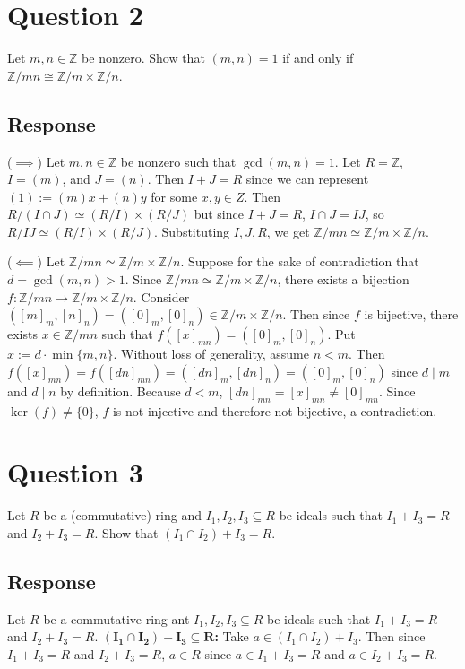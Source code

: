 \documentclass [12pt] {article}
\newcommand{\Z}{\mathbb{Z}}
\renewcommand{\bf}[1]{\textbf{{#1}}}
\begin{document}
\newpage
\section*{Question 2}
Let $m,n\in\Z$ be nonzero. Show that $(m,n)=1$ if and only if $\Z/mn\cong \Z/m \times \Z/n$.

\subsection*{Response}
($\implies$) Let $m, n \in \Z$ be nonzero such that $\gcd(m, n) = 1$. Let $R = \Z$, $I = (m)$, and 
$J = (n)$. Then $I + J = R$ since we can represent $(1) := (m)x + (n)y$ for some $x, y \in Z$. Then
$R/(I \cap J) \simeq (R/I) \times (R/J)$ but since $I + J = R$, $I \cap J = IJ$, so
$R/IJ \simeq (R/I) \times (R/J)$. Substituting $I, J, R$, we get
$\Z/mn \simeq \Z/m \times \Z/n$.
\vspace{0.5em}

($\impliedby$) Let $\Z/mn \simeq \Z/m \times \Z/n$. Suppose for the sake of
contradiction that $d = \gcd(m, n) > 1$. Since $\Z/mn \simeq \Z/m \times \Z/n$, there exists a
bijection $f : \Z/mn \to \Z/m \times \Z/n$. Consider 
$([m]_m, [n]_n) = ([0]_m, [0]_n) \in \Z/m \times \Z/n$. Then since $f$ is bijective, there exists 
$x \in \Z/mn$ such that $f([x]_{mn}) = ([0]_m, [0]_n)$. Put $x := d \cdot \min\{ m, n \}$. 
Without loss of generality, assume $n < m$. Then 
$f([x]_{mn}) = f([dn]_{mn}) = ([dn]_m, [dn]_n) = ([0]_m, [0]_n)$ since $d \mid m$ and $d \mid n$ by 
definition. Because $d < m$, $[dn]_{mn} = [x]_{mn} \neq [0]_{mn}$. Since
$\ker(f) \neq \{ 0 \}$, $f$ is not injective and therefore not bijective, a contradiction.



\newpage
\section*{Question 3}
Let $R$ be a (commutative) ring and  $I_1,I_2,I_3\subseteq R$ be ideals such that $I_1+I_3=R$ and
$I_2+I_3=R$. Show that $(I_1\cap I_2)+I_3=R$. 

\subsection*{Response}
Let $R$ be a commutative ring ant $I_1, I_2, I_3 \subseteq R$ be ideals such that $I_1 + I_3 = R$
and $I_2 + I_3 = R$. 
\bf{$\bm{(I_1 \cap I_2) + I_3 \subseteq R}$:}
Take $a \in (I_1 \cap I_2) + I_3$. Then since $I_1 + I_3 = R$ and $I_2 + I_3 = R$, $a \in R$ since
$a \in I_1 + I_3 = R$ and $a \in I_2 + I_3 = R$.
\vspace{1em}
\end{document}
